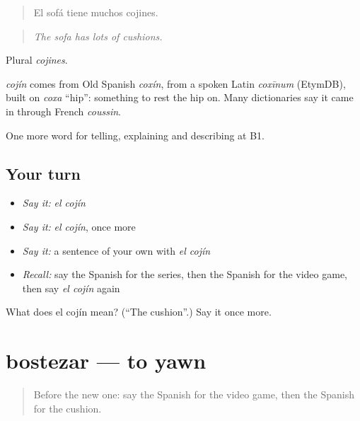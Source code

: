 \begin{quote}
El sofá tiene muchos cojines.
\end{quote}

\begin{quote}
\emph{The sofa has lots of cushions.}
\end{quote}

Plural \emph{cojines}.

\begin{cousinweb}
\emph{cojín} comes from Old Spanish \emph{coxín}, from a spoken Latin \emph{coxīnum} (EtymDB), built on \emph{coxa} \textquotedblleft{}hip\textquotedblright{}: something to rest the hip on. Many dictionaries say it came in through French \emph{coussin}.
\end{cousinweb}

\begin{grammarlens}[title={What you've built}]
One more word for telling, explaining and describing at B1.
\end{grammarlens}

\subsection*{Your turn}
\begin{itemize}
\raggedright
  \item \emph{Say it:} \emph{el cojín}
  \item \emph{Say it:} \emph{el cojín}, once more
  \item \emph{Say it:} a sentence of your own with \emph{el cojín}
  \item \emph{Recall:} say the Spanish for the series, then the Spanish for the video game, then say \emph{el cojín} again
\end{itemize}

\begin{tcolorbox}[breakable,colback=teal!4,colframe=teal!35!black,title={Before you move on}]
What does el cojín mean? (\textquotedblleft{}The cushion\textquotedblright{}.) Say it once more.
\end{tcolorbox}
\section[bostezar]{bostezar — to yawn}

\label{lesson:ES-C761-bostezar}



\begin{quote}
Before the new one: say the Spanish for the video game, then the Spanish for the cushion.
\end{quote}

